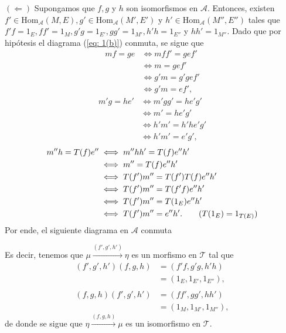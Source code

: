 \documentclass[tesis]{subfiles}
\begin{document}
\begin{Obs}
            $(\Leftarrow)$ Supongamos que $f, g$ y $h$ son isomorfismos en $\mathscr{A}$. Entonces, existen $f'\in\text{Hom}_\mathscr{A}(M,E), g'\in\text{Hom}_\mathscr{A}(M',E')$ y $h'\in\text{Hom}_\mathscr{A}(M'',E'')$ tales que $f'f=1_E, ff'=1_M, g'g=1_{E'}, gg'=1_{M'}, h'h=1_{E''}$ y $hh'=1_{M''}$. Dado que por hipótesis el diagrama (\ref{eq: 1(b)}) conmuta, se sigue que
            \begin{align*}
                mf=ge &\iff mff' = gef' \\
                      &\iff m = gef' \\
                      &\iff g'm = g'gef' \\
                      &\iff g'm=ef',
            \end{align*}
            \begin{align*}
                m'g=he' &\iff m'gg' = he'g' \\
                      &\iff m' = he'g' \\
                      &\iff h'm' = h'he'g' \\
                      &\iff h'm' = e'g',
            \end{align*}
            \begin{align*}
                m''h=T(f)e'' &\iff m''hh'=T(f)e''h' \\
                         &\iff m''=T(f)e''h' \\
                         &\iff T(f')m''=T(f')T(f)e''h' \\
                         &\iff T(f')m''=T(f'f)e''h' \\
                         &\iff T(f')m''=T(1_E)e''h' \\
                         &\iff T(f')m''=e''h'. \tag{$T(1_E)=1_{T(E)}$}
            \end{align*}
            Por ende, el siguiente diagrama en $\mathscr{A}$ conmuta
            \begin{center}
            \end{center}
            Es decir, tenemos que $\mu\xrightarrow{(f',g',h')} \eta$ es un morfismo en $\mathscr{T}$ tal que
            \begin{align*}
                (f',g',h')(f,g,h) &= (f'f,g'g,h'h) \\
                                  &= (1_E, 1_{E'}, 1_{E''}), \\ \\
                (f,g,h)(f',g',h') &= (ff',gg',hh') \\
                                  &= (1_M, 1_{M'}, 1_{M''}),
            \end{align*}
            de donde se sigue que $\eta\xrightarrow{(f,g,h)}\mu$ es un isomorfismo en $\mathscr{T}$.


\end{Obs}
\end{document}

